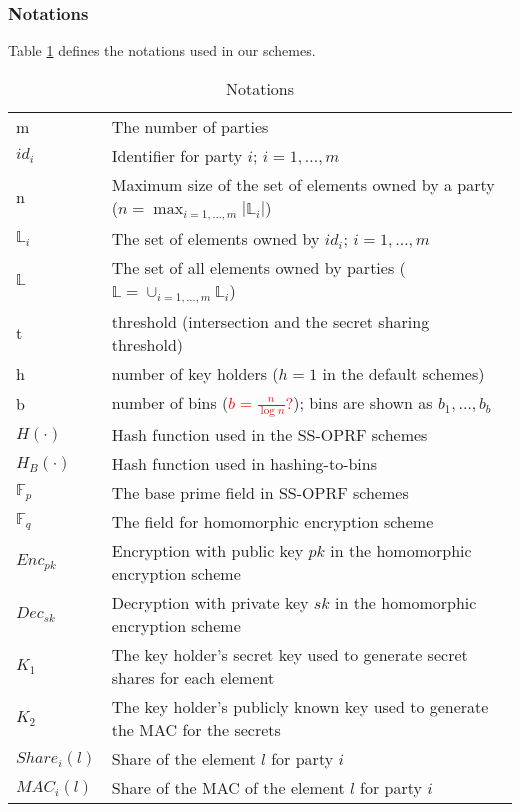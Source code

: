 \subsubsection{Notations} 
Table \ref{tab:Notations} defines the notations used in our schemes. 
\begin{table}[h!]
  \centering
  \caption{Notations}
  \label{tab:Notations}
  \begin{tabular}{ll}
    \toprule
     &  \\
    \midrule
    m & The number of parties \\
    $id_i$ &  Identifier for party $i$; $i = 1, \dots, m$\\
    n &  Maximum size of the set of elements owned by a party ($n = \max_{i = 1, \dots, m}{|\mathbb{L}_i|}$)\\
    $\mathbb{L}_i$ & The set of elements owned by $id_i$; $i = 1, \dots, m$\\
    $\mathbb{L}$ & The set of all elements owned by parties ($\mathbb{L} = \cup_{i = 1, \dots, m}{\mathbb{L}_i}$)\\
    t &  threshold (intersection and the secret sharing threshold)\\
    h & number of key holders ($h=1$ in the default schemes)\\
    b &  number of bins (\textcolor{red}{$b = \frac{n}{\log{n}}?$}); bins are shown as $b_1, \dots, b_b$\\
    $H(\cdot)$ & Hash function used in the SS-OPRF schemes\\
    $H_B(\cdot)$ & Hash function used in hashing-to-bins\\
    $\mathbb{F}_p$ & The base prime field in SS-OPRF schemes\\
    $\mathbb{F}_q$ & The field for homomorphic encryption scheme\\
    $Enc_{pk}$ &  Encryption with public key $pk$ in the homomorphic encryption scheme\\
    $Dec_{sk}$ &  Decryption with private key $sk$ in the homomorphic encryption scheme\\   
    $K_1$ & The key holder's secret key used to generate secret shares for each element\\
    $K_2$ & The key holder's publicly known key used to generate the MAC for the secrets \\
    $Share_i(l)$ & Share of the element $l$ for party $i$\\
    $MAC_i(l)$ & Share of the MAC of the element $l$ for party $i$\\
    \bottomrule
  \end{tabular}
\end{table}

